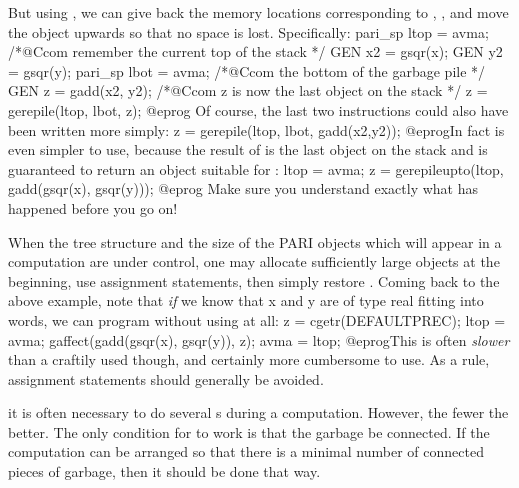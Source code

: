 But using , we can give back the memory locations corresponding
to , , and move the object  upwards so that no
space is lost. Specifically:
\bprog
  pari_sp ltop = avma;  /*@Ccom remember the current top of the stack */
  GEN x2 = gsqr(x);
  GEN y2 = gsqr(y);
  pari_sp lbot = avma;  /*@Ccom the bottom of the garbage pile */
  GEN z = gadd(x2, y2); /*@Ccom z is now the last object on the stack */
  z = gerepile(ltop, lbot, z);
@eprog
\noindent Of course, the last two instructions could also have been
written more simply:
\bprog
  z = gerepile(ltop, lbot, gadd(x2,y2));
@eprog\noindent In fact  is even simpler to use, because
the result of  is the last object on the stack and 
is guaranteed to return an object suitable for :
\bprog
  ltop = avma;
  z = gerepileupto(ltop, gadd(gsqr(x), gsqr(y)));
@eprog\noindent
Make sure you understand exactly what has happened before you go on!

 When the tree structure and
the size of the PARI objects which will appear in a computation are under
control, one may allocate sufficiently large objects at the beginning,
use assignment statements, then simply restore . Coming back to the
above example, note that \emph{if} we know that x and y are of type real
fitting into  words, we can program without using
 at all:
\bprog
  z = cgetr(DEFAULTPREC); ltop = avma;
  gaffect(gadd(gsqr(x), gsqr(y)), z);
  avma = ltop;
@eprog\noindent This is often \emph{slower} than a craftily used
 though, and certainly more cumbersome to use. As a rule,
assignment statements should generally be avoided.

 it is often necessary to do several
s during a computation. However, the fewer the better. The only
condition for  to work is that the garbage be connected. If the
computation can be arranged so that there is a minimal number of connected
pieces of garbage, then it should be done that way.


